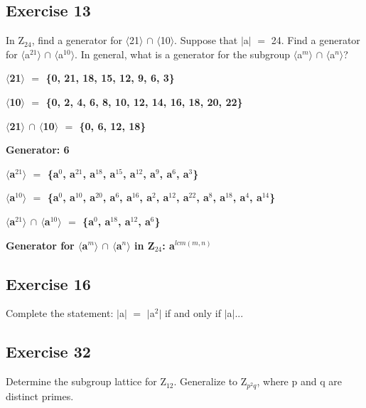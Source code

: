 \documentclass{article}
\newcommand{\mt}[1]{\ensuremath{#1}}
\newcommand\ssc[2][\DefaultOpt]{%
  \def\DefaultOpt{#2}%
  \subsection[#1]{#2}%
}
\newcommand{\av}[1]{\mt{|}#1\mt{|}}  %
\newcommand{\bk}[1]{\{#1\}}
\newcommand{\abk}[1]{\mt{\langle}#1\mt{\rangle}}
\newcommand{\eql}{\mt{=} }
\newcommand{\uw}[2]{#1\mt{_{#2}}}
\newcommand{\uf}[2]{#1\mt{^{#2}}}
\newcommand{\inn}{\mt{\cap} }
\begin{document}
\ssc{Exercise 13}{
	In \uw{Z}{24}, find a generator for \abk{21} \inn \abk{10}. Suppose that \av{a} \eql 24. Find a generator for \abk{\uf{a}{21}} \inn \abk{\uf{a}{10}}. In general, what is a generator for the subgroup \abk{\uf{a}{m}} \inn \abk{\uf{a}{n}}?
	
	\textbf{\abk{21} \eql \bk{0, 21, 18, 15, 12, 9, 6, 3}}
		
	\textbf{\abk{10} \eql \bk{0, 2, 4, 6, 8, 10, 12, 14, 16, 18, 20, 22}}
	
	\textbf{\abk{21} \inn \abk{10} \eql \bk{0, 6, 12, 18}}
	
	\textbf{Generator: 6}
	
	\textbf{\abk{\uf{a}{21}} \eql \bk{\uf{a}{0}, \uf{a}{21}, \uf{a}{18}, \uf{a}{15}, \uf{a}{12}, \uf{a}{9}, \uf{a}{6}, \uf{a}{3}}}
		
	\textbf{\abk{\uf{a}{10}} \eql \bk{\uf{a}{0}, \uf{a}{10}, \uf{a}{20}, \uf{a}{6}, \uf{a}{16}, \uf{a}{2}, \uf{a}{12}, \uf{a}{22}, \uf{a}{8}, \uf{a}{18}, \uf{a}{4}, \uf{a}{14}}}
	
	\textbf{\abk{\uf{a}{21}} \inn \abk{\uf{a}{10}} \eql \bk{\uf{a}{0}, \uf{a}{18}, \uf{a}{12},  \uf{a}{6}}}
		
	\textbf{Generator for \abk{\uf{a}{m}} \inn \abk{\uf{a}{n}} in \uw{Z}{24}: \uf{a}{lcm(m, n)}}
}

\ssc{Exercise 16}{
	Complete the statement: \av{a} \eql \av{\uf{a}{2}} if and only if \av{a}...
}

\ssc{Exercise 32}{
	Determine the subgroup lattice for \uw{Z}{12}. Generalize to \uw{Z}{\uf{p}{2}q}, where p and q are distinct primes.
}
\end{document}
